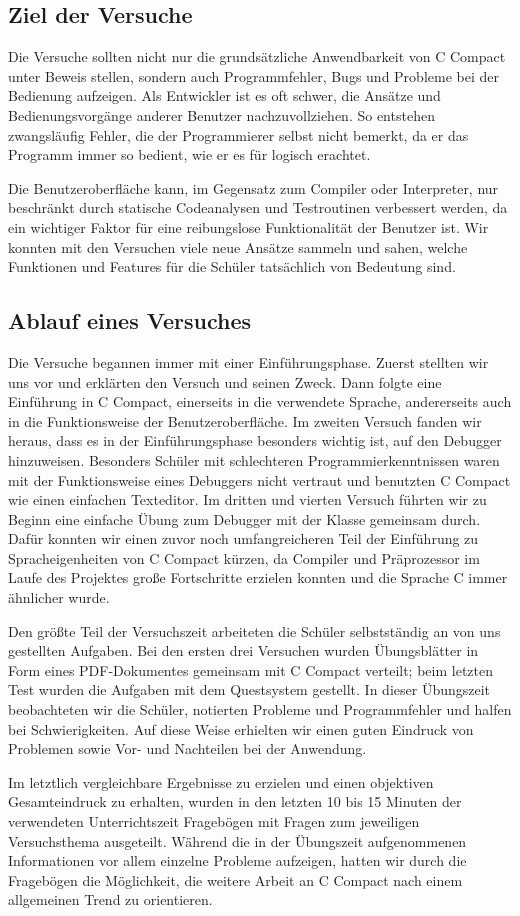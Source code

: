 \subsection{Ziel der Versuche}
Die Versuche sollten nicht nur die grundsätzliche Anwendbarkeit von C Compact unter Beweis stellen, sondern auch Programmfehler, Bugs und Probleme bei der Bedienung aufzeigen. Als Entwickler ist es oft schwer, die Ansätze und Bedienungsvorgänge anderer Benutzer nachzuvollziehen. So entstehen zwangsläufig Fehler, die der Programmierer selbst nicht bemerkt, da er das Programm immer so bedient, wie er es für logisch erachtet.

Die Benutzeroberfläche kann, im Gegensatz zum Compiler oder Interpreter, nur beschränkt durch statische Codeanalysen und Testroutinen verbessert werden, da ein wichtiger Faktor für eine reibungslose Funktionalität der Benutzer ist. Wir konnten mit den Versuchen viele neue Ansätze sammeln und sahen, welche Funktionen und Features für die Schüler tatsächlich von Bedeutung sind.

\subsection{Ablauf eines Versuches}
\label{sec:sci-trials-gui-sched}
Die Versuche begannen immer mit einer Einführungsphase. Zuerst stellten wir uns vor und erklärten den Versuch und seinen Zweck. Dann folgte eine Einführung in C Compact, einerseits in die verwendete Sprache, andererseits auch in die Funktionsweise der Benutzeroberfläche. Im zweiten Versuch fanden wir heraus, dass es in der Einführungsphase besonders wichtig ist, auf den Debugger hinzuweisen. Besonders Schüler mit schlechteren Programmierkenntnissen waren mit der Funktionsweise eines Debuggers nicht vertraut und benutzten C Compact wie einen einfachen Texteditor. Im dritten und vierten Versuch führten wir zu Beginn eine einfache Übung zum Debugger mit der Klasse gemeinsam durch. Dafür konnten wir einen zuvor noch umfangreicheren Teil der Einführung zu Spracheigenheiten von C Compact kürzen, da Compiler und Präprozessor im Laufe des Projektes große Fortschritte erzielen konnten und die Sprache C immer ähnlicher wurde.

Den größte Teil der Versuchszeit arbeiteten die Schüler selbstständig an von uns gestellten Aufgaben. Bei den ersten drei Versuchen wurden Übungsblätter in Form eines PDF-Dokumentes gemeinsam mit C Compact verteilt; beim letzten Test wurden die Aufgaben mit dem Questsystem gestellt. In dieser Übungszeit beobachteten wir die Schüler, notierten Probleme und Programmfehler und halfen bei Schwierigkeiten. Auf diese Weise erhielten wir einen guten Eindruck von Problemen sowie Vor- und Nachteilen bei der Anwendung.

Im letztlich vergleichbare Ergebnisse zu erzielen und einen objektiven Gesamteindruck zu erhalten, wurden in den letzten 10 bis 15 Minuten der verwendeten Unterrichtszeit Fragebögen mit Fragen zum jeweiligen Versuchsthema ausgeteilt. Während die in der Übungszeit aufgenommenen Informationen vor allem einzelne Probleme aufzeigen, hatten wir durch die Fragebögen die Möglichkeit, die weitere Arbeit an C Compact nach einem allgemeinen Trend zu orientieren.
